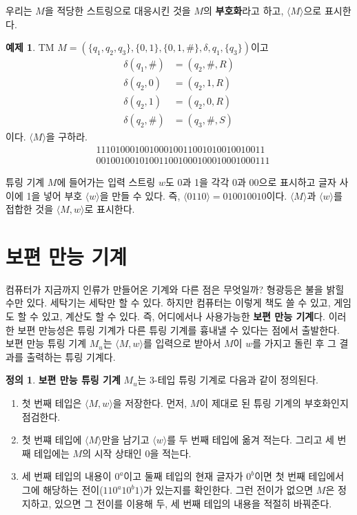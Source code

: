 \documentclass[b5paper]{book}
\theoremstyle{definition}
\newtheorem{defn}{정의}[chapter]
\newtheorem{ex}{예제}[chapter]
\begin{document}
우리는 $M$을 적당한 스트링으로 대응시킨 것을 $M$의 \textbf{부호화}라고 하고, $\langle M \rangle$으로 
표시한다.
\begin{ex}
    TM $M = (\{q_1, q_2, q_3\}, \{0, 1\}, \{0, 1, \#\}, \delta , q_1, \{q_3\})$이고 
    \begin{align*}
        \delta(q_1, \#) &= (q_2, \# , R) \\ 
        \delta(q_2, 0) &= (q_2, 1, R) \\ 
        \delta(q_2, 1) &= (q_2, 0, R) \\ 
        \delta(q_2, \#) &= (q_3, \#, S) 
    \end{align*}
    이다. $\langle M \rangle$을 구하라. 
    \begin{align*}
        &11101000100100010011001010010010011\\ 
        &001001001010011001000100010001000111
    \end{align*}
\end{ex}
튜링 기계 $M$에 들어가는 입력 스트링 $w$도 0과 1을 각각 0과 00으로 표시하고 글자 사이에 1을 넣어 
부호 $\langle w \rangle$을 만들 수 있다. 즉, $\langle 0110 \rangle = 010010010$이다. $\langle M \rangle$과
$\langle w \rangle$를 접합한 것을 $\langle M, w \rangle$로 표시한다. 
\section{보편 만능 기계}
컴퓨터가 지금까지 인류가 만들어온 기계와 다른 점은 무엇일까? 형광등은 불을 밝힐 수만 있다. 세탁기는 세탁만 할 수 있다.
하지만 컴퓨터는 이렇게 책도 쓸 수 있고, 게임도 할 수 있고, 계산도 할 수 있다. 즉, 어디에서나 사용가능한 
\textbf{보편 만능 기계}다. 이러한 보편 만능성은 튜링 기계가 다른 튜링 기계를 흉내낼 수 있다는 점에서 출발한다. \\ 
보편 만능 튜링 기계 $M_u$는 $\langle M, w\rangle$를 입력으로 받아서 $M$이 $w$를 가지고 돌린 후
그 결과를 출력하는 튜링 기계다. 
\begin{defn}
    \textbf{보편 만능 튜링 기계} $M_u$는 3-테입 튜링 기계로 다음과 같이 정의된다.
    \begin{enumerate}
        \item 첫 번째 테입은 $\langle M, w \rangle$을 저장한다. 먼저, $M$이 제대로 된 튜링 기계의
        부호화인지 점검한다. 
        \item 첫 번쨰 테입에 $\langle M \rangle$만을 남기고 $\langle w \rangle$를
        두 번째 테입에 옮겨 적는다. 그리고 세 번째 테입에는 $M$의 시작 상태인 $0$을 적는다. 
        \item 세 번째 테입의 내용이 $0^a$이고 둘째 테입의 현재 글자가 $0^b$이면 첫 번째 테입에서
        그에 해당하는 전이($110^a10^b1$)가 있는지를 확인한다. 그런 전이가 없으면 $M$은 정지하고, 있으면
        그 전이를 이용해 두, 세 번째 테입의 내용을 적절히 바꿔준다. 
    \end{enumerate}
\end{defn}
\end{document}
